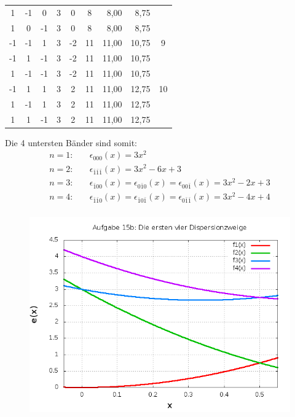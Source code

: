 \begin{table}[!ht]
\begin{center}
\begin{tabular}{|c|c|c|c|c|c|r|r|c|}
1 & -1 & 0 & 3 & 0 & 8 & 8,00 & 8,75 & \multicolumn{ 1}{c|}{} \\ \cline{ 1- 8}
1 & 0 & -1 & 3 & 0 & 8 & 8,00 & 8,75 & \multicolumn{ 1}{c|}{} \\ \hline
-1 & -1 & 1 & 3 & -2 & 11 & 11,00 & 10,75 & \multicolumn{ 1}{c|}{9} \\ \cline{ 1- 8}
-1 & 1 & -1 & 3 & -2 & 11 & 11,00 & 10,75 & \multicolumn{ 1}{c|}{} \\ \cline{ 1- 8}
1 & -1 & -1 & 3 & -2 & 11 & 11,00 & 10,75 & \multicolumn{ 1}{c|}{} \\ \hline
-1 & 1 & 1 & 3 & 2 & 11 & 11,00 & 12,75 & \multicolumn{ 1}{c|}{10} \\ \cline{ 1- 8}
1 & -1 & 1 & 3 & 2 & 11 & 11,00 & 12,75 & \multicolumn{ 1}{c|}{} \\ \cline{ 1- 8}
1 & 1 & -1 & 3 & 2 & 11 & 11,00 & 12,75 & \multicolumn{ 1}{c|}{} \\ \hline
\end{tabular}
\end{center}
\label{tab1}
\end{table}
Die 4 untersten Bänder sind somit:
\begin{align*}
n = 1:\quad & \epsilon_{000}(x) = 3 x^2 \\
n = 2:\quad & \epsilon_{\bar1\bar1\bar1}(x) =  3 x^2 - 6 x + 3\\
n = 3:\quad & \epsilon_{\bar100}(x) = \epsilon_{0\bar10}(x) = \epsilon_{00\bar1}(x) =  3 x^2  - 2 x + 3\\
n = 4:\quad & \epsilon_{\bar1\bar10}(x) = \epsilon_{\bar10\bar1}(x) = \epsilon_{0\bar1\bar1}(x) = 3 x^2 - 4 x + 4\\
\end{align*}
\suppressfloats

\begin{figure}
  \centering
  \includegraphics[width=11.5cm]{aufgabe15b.png}
\label{bild15b}
\end{figure}
